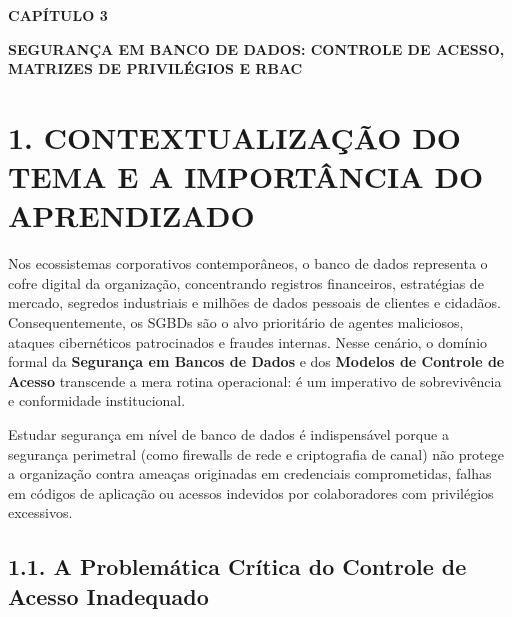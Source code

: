 
\begin{center}
\textbf{\fontsize{14}{16}\selectfont CAPÍTULO 3}

\vspace{0.5em}

\textbf{\fontsize{14}{16}\selectfont SEGURANÇA EM BANCO DE DADOS: CONTROLE DE ACESSO, MATRIZES DE PRIVILÉGIOS E RBAC}
\end{center}

\vspace{1.5em}

\section*{1. CONTEXTUALIZAÇÃO DO TEMA E A IMPORTÂNCIA DO APRENDIZADO}

Nos ecossistemas corporativos contemporâneos, o banco de dados representa o cofre digital da organização, concentrando registros financeiros, estratégias de mercado, segredos industriais e milhões de dados pessoais de clientes e cidadãos. Consequentemente, os SGBDs são o alvo prioritário de agentes maliciosos, ataques cibernéticos patrocinados e fraudes internas. Nesse cenário, o domínio formal da \textbf{Segurança em Bancos de Dados} e dos \textbf{Modelos de Controle de Acesso} transcende a mera rotina operacional: é um imperativo de sobrevivência e conformidade institucional.

Estudar segurança em nível de banco de dados é indispensável porque a segurança perimetral (como firewalls de rede e criptografia de canal) não protege a organização contra ameaças originadas em credenciais comprometidas, falhas em códigos de aplicação ou acessos indevidos por colaboradores com privilégios excessivos.

\subsection*{1.1. A Problemática Crítica do Controle de Acesso Inadequado}

